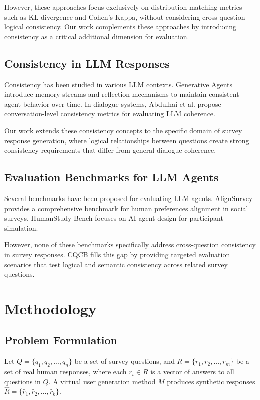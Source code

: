 \documentclass[sigconf, anonymous]{acmart}
\begin{document}
However, these approaches focus exclusively on distribution matching metrics such as KL divergence and Cohen's Kappa, without considering cross-question logical consistency. Our work complements these approaches by introducing consistency as a critical additional dimension for evaluation.

\subsection{Consistency in LLM Responses}

Consistency has been studied in various LLM contexts. Generative Agents \cite{park2023generative} introduce memory streams and reflection mechanisms to maintain consistent agent behavior over time. In dialogue systems, Abdulhai et al. \cite{abdulhai2025measuring} propose conversation-level consistency metrics for evaluating LLM coherence.

Our work extends these consistency concepts to the specific domain of survey response generation, where logical relationships between questions create strong consistency requirements that differ from general dialogue coherence.

\subsection{Evaluation Benchmarks for LLM Agents}

Several benchmarks have been proposed for evaluating LLM agents. AlignSurvey \cite{liu2025alignsurvey} provides a comprehensive benchmark for human preferences alignment in social surveys. HumanStudy-Bench \cite{zhang2026humanstudy} focuses on AI agent design for participant simulation.

However, none of these benchmarks specifically address cross-question consistency in survey responses. CQCB fills this gap by providing targeted evaluation scenarios that test logical and semantic consistency across related survey questions.

\section{Methodology}

\subsection{Problem Formulation}

Let $Q = \{q_1, q_2, ..., q_n\}$ be a set of survey questions, and $R = \{r_1, r_2, ..., r_m\}$ be a set of real human responses, where each $r_i \in R$ is a vector of answers to all questions in $Q$. A virtual user generation method $M$ produces synthetic responses $\hat{R} = \{\hat{r}_1, \hat{r}_2, ..., \hat{r}_k\}$.
\end{document}
